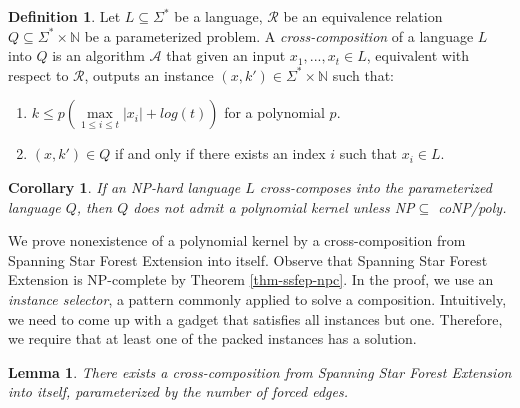 \documentclass[en]{pracamgr}
\newtheorem{lemma}{Lemma}
\newtheorem{corollary}{Corollary}
\theoremstyle{definition}
\newtheorem{definition}{Definition}
\newcommand{\ssfep}{{\sc Spanning Star Forest Extension}}
\begin{document}
\begin{definition}\label{cross-composition}
	Let $L \subseteq \Sigma^*$ be a language, $\mathcal{R}$ be an equivalence relation $Q \subseteq \Sigma^* \times \mathbb{N}$ be a parameterized problem. A \textit{cross-composition} of a language $L$ into $Q$ is an algorithm $\mathcal{A}$ that given an input $x_1,...,x_t \in L$, equivalent with respect to $\mathcal{R}$, outputs an instance $(x,k') \in \Sigma^* \times \mathbb{N}$ such that:
	\begin{enumerate}
		\item $k \leq p(\max\limits_{1 \leq i \leq t} |x_i| + log(t))$ for a polynomial $p$.
		\item $(x,k') \in Q$ if and only if there exists an index $i$ such that $x_i \in L$.
	\end{enumerate}
\end{definition}

\begin{corollary}\label{nokernel}
	If an NP-hard language $L$ cross-composes into the parameterized language $Q$, then $Q$ does not admit a polynomial kernel unless \textit{NP$\subseteq$ coNP/poly}.
\end{corollary}

We prove nonexistence of a polynomial kernel by a cross-composition from \ssfep{} into itself. Observe that \ssfep{} is NP-complete by Theorem \ref{thm-ssfep-npc}. In the proof, we use an \emph{instance selector}, a pattern commonly applied to solve a composition. Intuitively, we need to come up with a gadget that satisfies all instances but one. Therefore, we require that at least one of the packed instances has a solution.

\begin{lemma}\label{cross-ssfe}
	There exists a cross-composition from \ssfep{} into itself, parameterized by the number of forced edges.
\end{lemma}
\end{document}
